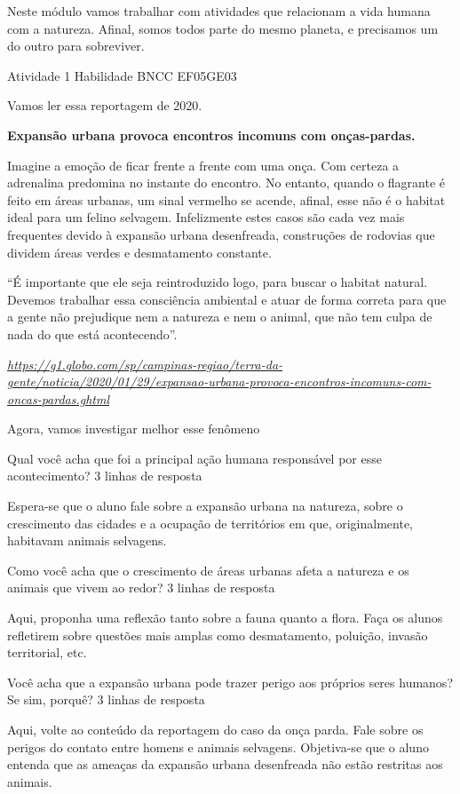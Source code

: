 Neste módulo vamos trabalhar com atividades que relacionam a vida humana
com a natureza. Afinal, somos todos parte do mesmo planeta, e precisamos
um do outro para sobreviver.

Atividade 1 Habilidade BNCC EF05GE03

Vamos ler essa reportagem de 2020.

\textbf{Expansão urbana provoca encontros incomuns com onças-pardas. }

Imagine a emoção de ficar frente a frente com uma onça. Com certeza a
adrenalina predomina no instante do encontro. No entanto, quando o
flagrante é feito em áreas urbanas, um sinal vermelho se acende, afinal,
esse não é o habitat ideal para um felino selvagem. Infelizmente estes
casos são cada vez mais frequentes devido à expansão urbana desenfreada,
construções de rodovias que dividem áreas verdes e desmatamento
constante.

``É importante que ele seja reintroduzido logo, para buscar o habitat
natural. Devemos trabalhar essa consciência ambiental e atuar de forma
correta para que a gente não prejudique nem a natureza e nem o animal,
que não tem culpa de nada do que está acontecendo''.

\href{https://g1.globo.com/sp/campinas-regiao/terra-da-gente/noticia/2020/01/29/expansao-urbana-provoca-encontros-incomuns-com-oncas-pardas.ghtml}{\emph{https://g1.globo.com/sp/campinas-regiao/terra-da-gente/noticia/2020/01/29/expansao-urbana-provoca-encontros-incomuns-com-oncas-pardas.ghtml}}

Agora, vamos investigar melhor esse fenômeno

Qual você acha que foi a principal ação humana responsável por esse
acontecimento? 3 linhas de resposta

Espera-se que o aluno fale sobre a expansão urbana na natureza, sobre o
crescimento das cidades e a ocupação de territórios em que,
originalmente, habitavam animais selvagens.

Como você acha que o crescimento de áreas urbanas afeta a natureza e os
animais que vivem ao redor? 3 linhas de resposta

Aqui, proponha uma reflexão tanto sobre a fauna quanto a flora. Faça os
alunos refletirem sobre questões mais amplas como desmatamento,
poluição, invasão territorial, etc.

Você acha que a expansão urbana pode trazer perigo aos próprios seres
humanos? Se sim, porquê? 3 linhas de resposta

Aqui, volte ao conteúdo da reportagem do caso da onça parda. Fale sobre
os perigos do contato entre homens e animais selvagens. Objetiva-se que
o aluno entenda que as ameaças da expansão urbana desenfreada não estão
restritas aos animais.

